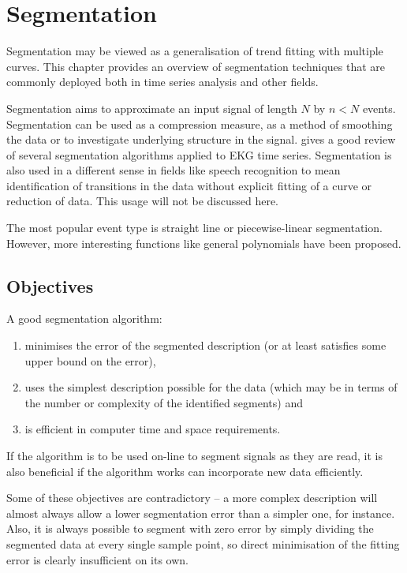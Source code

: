 \chapter{Segmentation}\label{chap:lit:segmentation}
\begin{overview}
  Segmentation may be viewed as a generalisation of trend fitting with multiple curves.
  This chapter provides an overview of segmentation techniques that are commonly deployed both in time series analysis and other fields.
\end{overview}

Segmentation aims to approximate an input signal of length $N$ by $n<N$ events.
Segmentation can be used as a compression measure, as a method of smoothing the data or to investigate underlying structure in the signal.
\citet{keogh.chu.ea1993segmenting} gives a good review of several segmentation algorithms applied to EKG time series.
Segmentation is also used in a different sense in fields like speech recognition to mean identification of transitions in the data without explicit fitting of a curve or reduction of data.
This usage will not be discussed here.

The most popular event type is straight line or piecewise-linear segmentation.
However, more interesting functions like general polynomials \citep{arora.khot2003fitting} have been proposed.

\section{Objectives}
\label{sec:objectives}

A good segmentation algorithm:
\begin{enumerate}
\item minimises the error of the segmented description (or at least satisfies some upper bound on the error),
\item uses the simplest description possible for the data (which may be in terms of the number or complexity of the identified segments) and
\item is efficient in computer time and space requirements.
\end{enumerate}
If the algorithm is to be used on-line to segment signals as they are read, it is also beneficial if the algorithm works can incorporate new
data efficiently.

Some of these objectives are contradictory -- a more complex description will almost always allow a lower segmentation error than a simpler one, for instance.
Also, it is always possible to segment with zero error by simply dividing the segmented data at every single sample point, so direct minimisation of the fitting error is clearly insufficient on its own.

